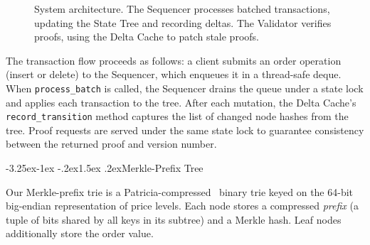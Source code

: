 \documentclass[letterpaper,twocolumn,10pt]{article}
\makeatletter
\renewcommand{\subsection}{\@startsection{subsection}{2}{\z@}%
  {-3.25ex\@plus -1ex \@minus -.2ex}{1.5ex \@plus .2ex}{\normalfont\normalsize\bfseries}}
\makeatother
\begin{document}
\begin{figure}[t]
  \centering
  \caption{System architecture. The Sequencer processes batched transactions, updating the State Tree and recording deltas. The Validator verifies proofs, using the Delta Cache to patch stale proofs.}
  \label{fig:architecture}
\end{figure}

The transaction flow proceeds as follows:
a client submits an order operation (insert or delete) to the Sequencer, which enqueues it in a thread-safe deque.
When \texttt{process\_batch} is called, the Sequencer drains the queue under a state lock and applies each transaction to the tree.
After each mutation, the Delta Cache's \texttt{record\_transition} method captures the list of changed node hashes from the tree.
Proof requests are served under the same state lock to guarantee consistency between the returned proof and version number.

\subsection{Merkle-Prefix Tree}

Our Merkle-prefix trie is a Patricia-compressed~\cite{morrison1968patricia} binary trie keyed on the 64-bit big-endian representation of price levels.
Each node stores a compressed \emph{prefix} (a tuple of bits shared by all keys in its subtree) and a Merkle hash.
Leaf nodes additionally store the order value.
\end{document}
